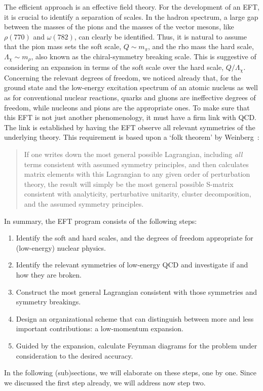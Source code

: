 \documentclass[sort&compress,preprint,3p]{elsarticle}
\begin{document}
The efficient approach is an effective field theory.
For the development of an EFT, it is crucial to identify a separation of
scales. In the hadron spectrum, a large gap between the masses of
the pions and the masses of the vector mesons, like $\rho(770)$ and $\omega(782)$,
can clearly be identified. Thus, it is natural to assume that the pion mass sets the soft scale, 
$Q \sim m_\pi$,
and the rho mass the hard scale, $\Lambda_\chi \sim m_\rho$, also known
as the chiral-symmetry breaking scale.
This is suggestive of considering an expansion in terms of the soft scale over the hard scale,
$Q/\Lambda_\chi$.
Concerning the relevant degrees of freedom, we noticed already that,
for the ground state and the
low-energy excitation spectrum of
an atomic nucleus as well as for conventional nuclear
reactions,
quarks and gluons are ineffective degrees of freedom,
while nucleons and pions are the appropriate ones.
To make sure that this EFT is not just another phenomenology,
it must have a firm link with QCD.
The link is established by having the EFT observe
all relevant symmetries of the underlying theory.
This requirement is based upon a `folk theorem' by
Weinberg~\cite{Wei79}:
\begin{quote}
If one writes down the most general possible Lagrangian, including {\it all}
terms consistent with assumed symmetry principles,
and then calculates matrix elements with this Lagrangian to any given order of
perturbation theory, the result will simply be the most general possible 
S-matrix consistent with analyticity, perturbative unitarity,
cluster decomposition, and the assumed symmetry principles.
\end{quote}
In summary, the EFT program consists of the following steps:
\begin{enumerate}
\item
Identify the soft and hard scales, and the degrees of freedom appropriate
for (low-energy) nuclear physics.
\item
Identify the relevant symmetries of low-energy QCD and
investigate if and how they are broken.
\item
Construct the most general Lagrangian consistent with those
symmetries and symmetry breakings.
\item
Design an organizational scheme that can distinguish
between more and less important contributions: 
a low-momentum expansion.
\item
Guided by the expansion, calculate Feynman diagrams
for the problem under consideration
to the desired accuracy.
\end{enumerate}
In the following (sub)sections,
we will elaborate on these steps, one by one.
Since we discussed the first step already, we will address now step two.
\end{document}
